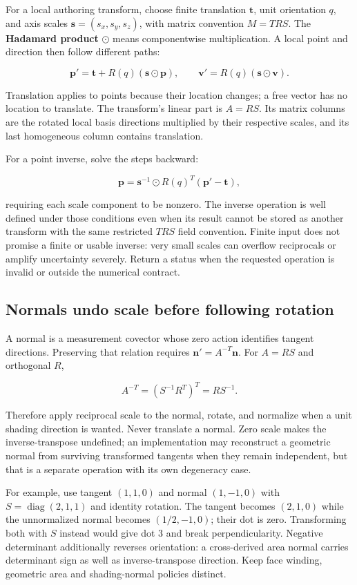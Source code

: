 For a local authoring transform, choose finite translation \(\mathbf t\), unit orientation \(q\), and axis scales \(\mathbf s=(s_x,s_y,s_z)\), with matrix convention \(M=TRS\). The \textbf{Hadamard product} \(\odot\) means componentwise multiplication. A local point and direction then follow different paths:

\[
\mathbf p'=\mathbf t+R(q)(\mathbf s\odot\mathbf p),
\qquad
\mathbf v'=R(q)(\mathbf s\odot\mathbf v).
\]

Translation applies to points because their location changes; a free vector has no location to translate. The transform's linear part is \(A=RS\). Its matrix columns are the rotated local basis directions multiplied by their respective scales, and its last homogeneous column contains translation.

For a point inverse, solve the steps backward:

\[
\mathbf p=\mathbf s^{-1}\odot R(q)^T(\mathbf p'-\mathbf t),
\]

requiring each scale component to be nonzero. The inverse operation is well defined under those conditions even when its result cannot be stored as another transform with the same restricted \(TRS\) field convention. Finite input does not promise a finite or usable inverse: very small scales can overflow reciprocals or amplify uncertainty severely. Return a status when the requested operation is invalid or outside the numerical contract.

\subsection{Normals undo scale before following rotation}\label{01-foundations-i-ch019-normals-undo-scale-before-following-rotation}

A normal is a measurement covector whose zero action identifies tangent directions. Preserving that relation requires \(\mathbf n'=A^{-T}\mathbf n\). For \(A=RS\) and orthogonal \(R\),

\[
A^{-T}=\left(S^{-1}R^T\right)^T=RS^{-1}.
\]

Therefore apply reciprocal scale to the normal, rotate, and normalize when a unit shading direction is wanted. Never translate a normal. Zero scale makes the inverse-transpose undefined; an implementation may reconstruct a geometric normal from surviving transformed tangents when they remain independent, but that is a separate operation with its own degeneracy case.

For example, use tangent \((1,1,0)\) and normal \((1,-1,0)\) with \(S=\operatorname{diag}(2,1,1)\) and identity rotation. The tangent becomes \((2,1,0)\) while the unnormalized normal becomes \((1/2,-1,0)\); their dot is zero. Transforming both with \(S\) instead would give dot \(3\) and break perpendicularity. Negative determinant additionally reverses orientation: a cross-derived area normal carries determinant sign as well as inverse-transpose direction. Keep face winding, geometric area and shading-normal policies distinct.

